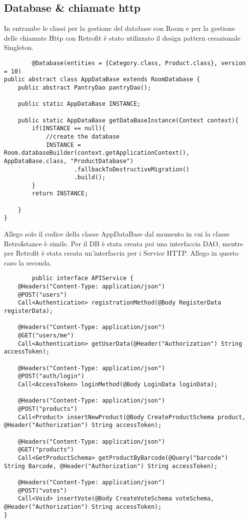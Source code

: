 \documentclass[11pt]{article}
\begin{document}
    \subsection{Database \& chiamate http}
    In entrambe le classi per la gestione del database con Room e per la gestione delle chiamate Http con Retrofit è stato utilizzato il design pattern creazionale 
    Singleton. 
    \begin{lstlisting}
        @Database(entities = {Category.class, Product.class}, version = 10)
public abstract class AppDataBase extends RoomDatabase {
    public abstract PantryDao pantryDao();

    public static AppDataBase INSTANCE;

    public static AppDataBase getDataBaseInstance(Context context){
        if(INSTANCE == null){
            //create the database
            INSTANCE = Room.databaseBuilder(context.getApplicationContext(), AppDataBase.class, "ProductDatabase")
                    .fallbackToDestructiveMigration()
                    .build();
        }
        return INSTANCE;

    }
}
    \end{lstlisting}
    Allego solo il codice della classe AppDataBase dal momento in cui la classe RetroIstance è simile. Per il DB è stata creata poi una interfaccia DAO, mentre 
    per Retrofit è stata creata un'interfaccia per i Service HTTP. Allego in questo caso la seconda.
    \begin{lstlisting}
        public interface APIService {
    @Headers("Content-Type: application/json")
    @POST("users")
    Call<Authentication> registrationMethod(@Body RegisterData registerData);

    @Headers("Content-Type: application/json")
    @GET("users/me")
    Call<Authentication> getUserData(@Header("Authorization") String accessToken);

    @Headers("Content-Type: application/json")
    @POST("auth/login")
    Call<AccessToken> loginMethod(@Body LoginData loginData);

    @Headers("Content-Type: application/json")
    @POST("products")
    Call<Product> insertNewProduct(@Body CreateProductSchema product, @Header("Authorization") String accessToken);

    @Headers("Content-Type: application/json")
    @GET("products")
    Call<GetProductSchema> getProductByBarcode(@Query("barcode") String Barcode, @Header("Authorization") String accessToken);

    @Headers("Content-Type: application/json")
    @POST("votes")
    Call<Void> insertVote(@Body CreateVoteSchema voteSchema, @Header("Authorization") String accessToken);
}
    \end{lstlisting}
\end{document}
